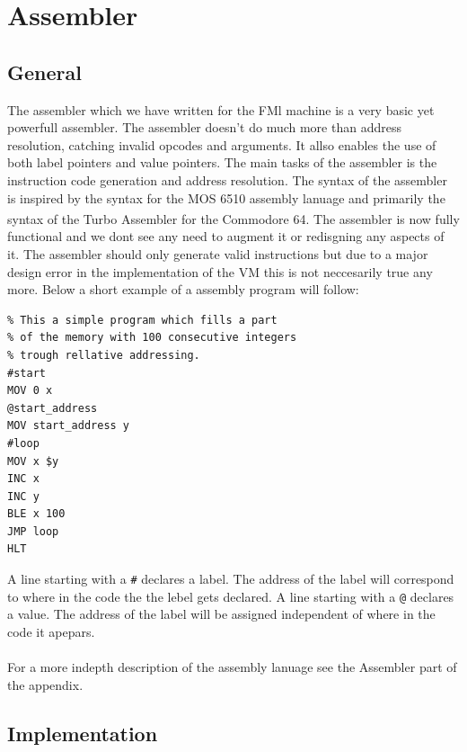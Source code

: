\documentclass{article}
\newcommand{\V}{\verb}
\begin{document}
\section{Assembler}
\subsection{General}
The assembler which we have written for the FMl machine is a very basic yet
powerfull assembler. The assembler doesn't do much more than address
resolution, catching invalid opcodes and arguments. It allso enables the use of
both label pointers and value pointers. The main tasks of the assembler is the instruction code generation and
address resolution. The syntax of the assembler is inspired by the syntax for
the MOS 6510 assembly lanuage and primarily the syntax of the Turbo
Assembler\textsuperscript{\cite{tasm}} for the Commodore
64\textsuperscript{\cite{c64}}. The assembler is now fully functional and  we
dont see any need to augment it or redisgning any aspects of it. The assembler should only generate valid instructions but due to a major design error in the
implementation of the VM this is not neccesarily true any more. Below a short
example of a assembly program will follow:
\begin{verbatim}
% This a simple program which fills a part 
% of the memory with 100 consecutive integers
% trough rellative addressing.
#start
MOV 0 x
@start_address
MOV start_address y
#loop
MOV x $y
INC x
INC y
BLE x 100
JMP loop
HLT
\end{verbatim}
A line starting with a \V+#+ declares a label. The address of the label will
correspond to where in the code the the lebel gets declared.
A line starting with a \V+@+ declares a value. The address of the label will be
assigned independent of where in the code it apepars.
\\
\\
For a more indepth description of the assembly lanuage see the Assembler
part of the appendix.

\subsection{Implementation}
\end{document}
